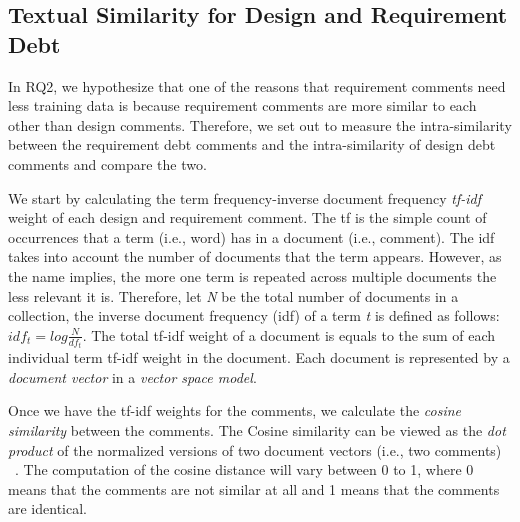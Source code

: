


\subsection{Textual Similarity for Design and Requirement Debt}


In RQ2, we hypothesize that one of the reasons that requirement \SATD comments need less training data is because requirement \SATD comments are more similar to each other than design \SATD comments. Therefore, we set out to measure the intra-similarity between the requirement debt comments and the intra-similarity of design debt comments and compare the two.


We start by calculating the term frequency-inverse document frequency \textit{tf-idf} weight of each design and requirement \SATD comment. The tf is the simple count of occurrences that a term (i.e., word) has in a document (i.e., comment). The idf takes into account the number of documents that the term appears. However, as the name implies, the more one term is repeated across multiple documents the less relevant it is. Therefore, let \textit{N} be the total number of documents in a collection, the inverse document frequency (idf) of a term \textit{t} is defined as follows: \(idf_{t} = log\frac{N}{df_{t}}\). The total tf-idf weight of a document is equals to the sum of each individual term tf-idf weight in the document. Each document is represented by a \textit{document vector} in a \textit{vector space model}. 

Once we have the tf-idf weights for the comments, we calculate the \textit{cosine similarity} between the comments. The Cosine similarity can be viewed as the \textit{dot product} of the normalized versions of two document vectors (i.e., two comments) ~\cite{Manning2008book}. The computation of the cosine distance will vary between 0 to 1, where 0 means that the comments are not similar at all and 1 means that the comments are identical.

